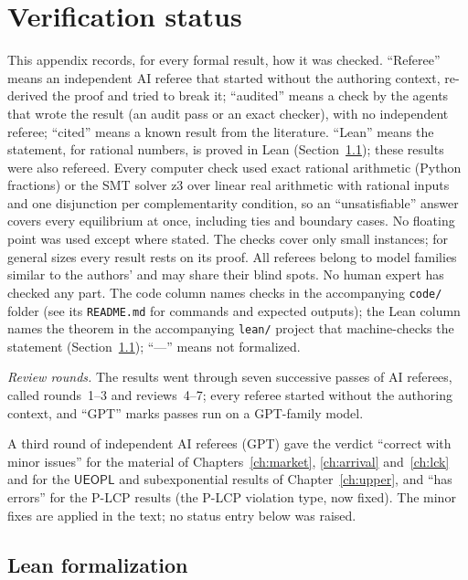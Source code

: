 \chapter{Verification status}\label{app:status}
\small

This appendix records, for every formal result, how it was checked. ``Referee'' means an independent AI
referee that started without the authoring context, re-derived the proof and tried to break it;
``audited'' means a check by the agents that wrote the result (an audit pass or an exact checker), with no independent referee; ``cited'' means a known result from the literature. ``Lean'' means the statement, for rational numbers, is proved in Lean (Section~\ref{sec:lean-status}); these results were also refereed. Every computer check used exact
rational arithmetic (Python fractions) or the SMT solver z3 over linear real arithmetic with rational
inputs and one disjunction per complementarity condition, so an ``unsatisfiable'' answer covers every
equilibrium at once, including ties and boundary cases. No floating point was used except where stated.
The checks cover only small instances; for general sizes every result rests on its proof. All referees
belong to model families similar to the authors' and may share their blind spots. No human expert has
checked any part. The code column names checks in the accompanying \texttt{code/} folder (see its
\texttt{README.md} for commands and expected outputs); the Lean column names the theorem in the accompanying \texttt{lean/} project that machine-checks the
statement (Section~\ref{sec:lean-status}); ``---'' means not formalized.

\emph{Review rounds.} The results went through seven successive passes of AI referees, called rounds~1--3 and reviews~4--7; every referee started without the authoring context, and ``GPT'' marks passes run on a GPT-family model.

A third round of independent AI referees (GPT) gave the verdict ``correct with minor issues'' for the
material of Chapters~\ref{ch:market}, \ref{ch:arrival} and~\ref{ch:lck} and for the $\mathsf{UEOPL}$ and
subexponential results of Chapter~\ref{ch:upper}, and ``has errors'' for the P-LCP results (the P-LCP
violation type, now fixed). The minor fixes are applied in the text; no status entry below was raised.

\section{Lean formalization}\label{sec:lean-status}

